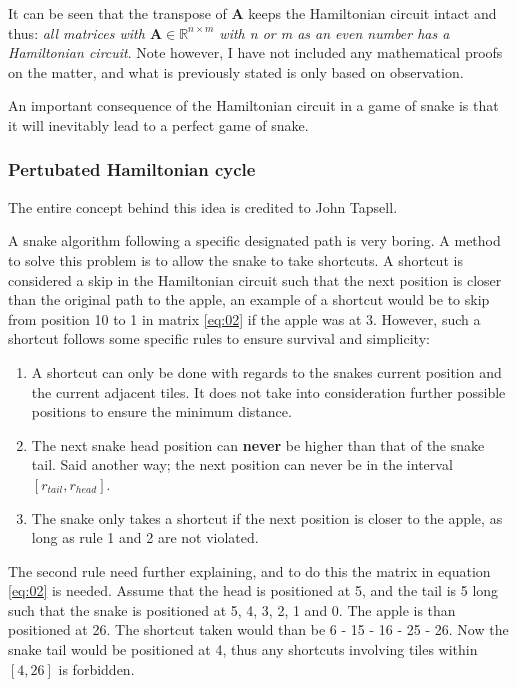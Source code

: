 \documentclass[%
 uio,
 jmp,
 amsmath,amssymb,
 reprint, nofootinbib]{revtex4-1}
\numberwithin{equation}{section}
\begin{document}
It can be seen that the transpose of \(\bm{A}\) keeps the Hamiltonian circuit intact and thus: \textit{all matrices with \(\bm{A}  \in \mathbb{R}^{n\times m}\) with n or m as an even number has a Hamiltonian circuit}. Note however, I have not included any mathematical proofs on the matter, and what is previously stated is only based on observation.

An important consequence of the Hamiltonian circuit in a game of snake is that it will inevitably lead to a perfect game of snake.

\subsubsection{Pertubated Hamiltonian cycle}

The entire concept behind this idea is credited to John Tapsell\citep{Greedy_H}.

A snake algorithm following a specific designated path is very boring. A method to solve this problem is to allow the snake to take shortcuts. A shortcut is considered a skip in the Hamiltonian circuit such that the next position is closer than the original path to the apple, an example of a shortcut would be to skip from position 10 to 1 in matrix \ref{eq:02} if the apple was at 3. However, such a shortcut follows some specific rules to ensure survival and simplicity:
\begin{enumerate}
\item A shortcut can only be done with regards to the snakes current position and the current adjacent tiles. It does not take into consideration further possible positions to ensure the minimum distance.
\item The next snake head position can \textbf{never} be higher than that of the snake tail. Said another way; the next position can never be in the interval \([r_{tail}, r_{head}]\).
\item The snake only takes a shortcut if the next position is closer to the apple, as long as rule 1 and 2 are not violated.
\end{enumerate}
The second rule need further explaining, and to do this the matrix in equation \ref{eq:02} is needed. Assume that the head is positioned at 5, and the tail is 5 long such that the snake is positioned at 5, 4, 3, 2, 1 and 0. The apple is than positioned at 26. The shortcut taken would than be 6 - 15 - 16 - 25 - 26. Now the snake tail would be positioned at 4, thus any shortcuts involving tiles within \([4, 26]\) is forbidden.
\end{document}
